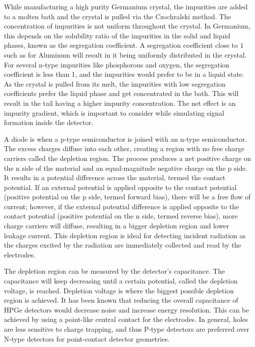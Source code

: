 While manufacturing a high purity Germanium crystal, the impurities are added to a molten bath and the crystal is pulled via the Czochralski method. The concentration of impurities is not uniform throughout the crystal. In Germanium, this depends on the solubility ratio of the impurities in the solid and liquid phases, known as the segregation coefficient. A segregation coefficient close to $1$ such as for Aluminum will result in it being uniformly distributed in the crystal. For several n-type impurities like phosphorous and oxygen, the segregation coefficient is less than 1, and the impurities would prefer to be in a liquid state. As the crystal is pulled from its melt, the impurities with low segregation coefficients prefer the liquid phase and get concentrated in the bath. This will result in the tail having a higher impurity concentration. The net effect is an impurity gradient, which is important to consider while simulating signal formation inside the detector.

A diode is when a p-type semiconductor is joined with an n-type semiconductor. The excess charges diffuse into each other, creating a region with no free charge carriers called the depletion region. The process produces a net positive charge on the n side of the material and an equal-magnitude negative charge on the p side. It results in a potential difference across the material, termed the contact potential. If an external potential is applied opposite to the contact potential (positive potential on the p side, termed forward bias), there will be a free flow of current; however, if the external potential difference is applied opposite to the contact potential (positive potential on the n side, termed reverse bias), more charge carriers will diffuse, resulting in a bigger depletion region and lower leakage current. This depletion region is ideal for detecting incident radiation as the charges excited by the radiation are immediately collected and read by the electrodes.

The depletion region can be measured by the detector's capacitance. The capacitance will keep decreasing until a certain potential, called the depletion voltage, is reached. Depletion voltage is where the biggest possible depletion region is achieved. It has been known that reducing the overall capacitance of HPGe detectors would decrease noise and increase energy resolution. This can be achieved by using a point-like central contact for the electrodes. In general, holes are less sensitive to charge trapping, and thus P-type detectors are preferred over N-type detectors for point-contact detector geometries.

